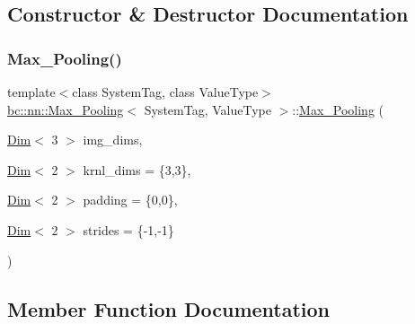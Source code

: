 \subsection{Constructor \& Destructor Documentation}
\mbox{\label{structbc_1_1nn_1_1Max__Pooling_a69393077da5937894221f44aa7e2b2a8}} 
\subsubsection{\texorpdfstring{Max\+\_\+\+Pooling()}{Max\_Pooling()}}
{\footnotesize\ttfamily template$<$class System\+Tag, class Value\+Type$>$ \\
\hyperlink{structbc_1_1nn_1_1Max__Pooling}{bc\+::nn\+::\+Max\+\_\+\+Pooling}$<$ System\+Tag, Value\+Type $>$\+::\hyperlink{structbc_1_1nn_1_1Max__Pooling}{Max\+\_\+\+Pooling} (\begin{DoxyParamCaption}\item[{\hyperlink{structbc_1_1Dim}{Dim}$<$ 3 $>$}]{img\+\_\+dims,  }\item[{\hyperlink{structbc_1_1Dim}{Dim}$<$ 2 $>$}]{krnl\+\_\+dims = {\ttfamily \{3,3\}},  }\item[{\hyperlink{structbc_1_1Dim}{Dim}$<$ 2 $>$}]{padding = {\ttfamily \{0,0\}},  }\item[{\hyperlink{structbc_1_1Dim}{Dim}$<$ 2 $>$}]{strides = {\ttfamily \{-\/1,-\/1\}} }\end{DoxyParamCaption})\hspace{0.3cm}{\ttfamily [inline]}}



\subsection{Member Function Documentation}
\mbox{\label{structbc_1_1nn_1_1Max__Pooling_a77c095e97891545afd2a9d8ade1dc2a3}} 
